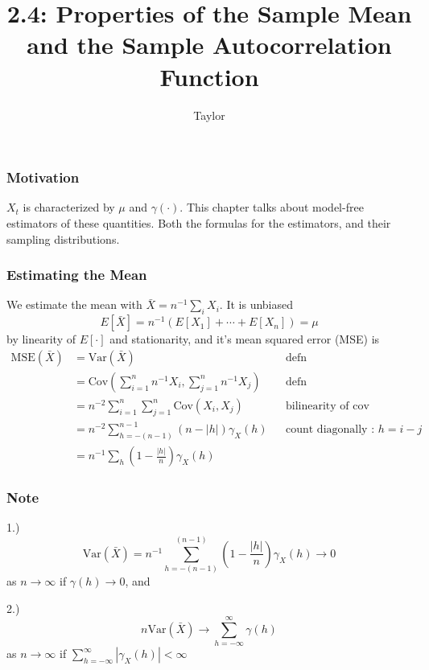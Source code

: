 \documentclass{beamer}
\title["2.4"]{2.4: Properties of the Sample Mean and the Sample Autocorrelation Function}
\author{Taylor}
\institute[UVA] 
{
University of Virginia \\
\medskip
\textit{} 
}
\date{}
\begin{document}

\begin{frame}
\titlepage 
\end{frame}

\begin{frame}
\frametitle{Motivation}

$X_t$ is characterized by $\mu$ and $\gamma(\cdot)$. This chapter talks about model-free estimators of these quantities. Both the formulas for the estimators, and their sampling distributions. 
\end{frame}


\begin{frame}
\frametitle{Estimating the Mean}

We estimate the mean with $\bar{X} = n^{-1}\sum_iX_i$. It is unbiased
\[
E[\bar{X}] = n^{-1}(E[X_1] + \cdots + E[X_n]) = \mu
\]
by linearity of $E[\cdot]$ and stationarity, and it's mean squared error (MSE) is
\begin{align*}
\text{MSE}(\bar{X}) &= \text{Var}(\bar{X}) && \text{defn}\\
&= \text{Cov}\left(\sum_{i=1}^n n^{-1}X_i , \sum_{j=1}^n n^{-1}X_j \right) && \text{defn} \\
&= n^{-2} \sum_{i=1}^n\sum_{j=1}^n \text{Cov}(X_i,X_j) && \text{bilinearity of cov} \\
&= n^{-2} \sum_{h=-(n-1)}^{n-1} (n - |h|) \gamma_X(h) && \text{count diagonally : $h = i-j$} \\
&= n^{-1} \sum_{h} \left(1 - \frac{|h|}{n} \right) \gamma_X(h)
\end{align*}


\end{frame}



\begin{frame}
\frametitle{Note}
\begin{block}{1.)} 
\[
\text{Var}(\bar{X}) = n^{-1} \sum_{h=-(n-1)}^{(n-1)} \left(1 - \frac{|h|}{n} \right) \gamma_X(h) \to 0 
\]
as $n \to \infty$ if $\gamma(h) \to 0$, and \\
\end{block}

\begin{block}{2.)}
\[
n\text{Var}(\bar{X}) \to \sum_{h=-\infty}^{\infty} \gamma(h)
\]
as $n \to \infty$ if $\sum_{h=-\infty}^{\infty} |\gamma_X(h)| < \infty$ 

\href{https://goo.gl/wVjL7b}{}
\end{block}
\end{frame}
\end{document}
